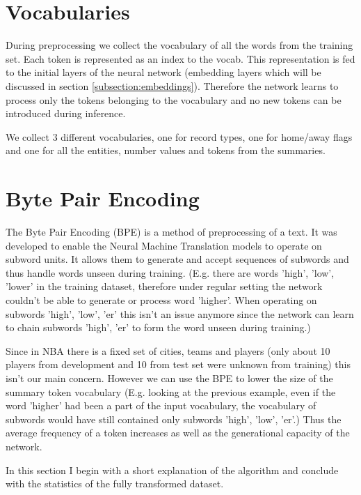 \section{Vocabularies}

During preprocessing we collect the vocabulary of all the words from the training set. Each token is represented as an index to the vocab. This representation is fed to the initial layers of the neural network (embedding layers which will be discussed in section \ref{subsection:embeddings}). Therefore the network learns to process only the tokens belonging to the vocabulary and no new tokens can be introduced during inference.

We collect 3 different vocabularies, one for record types, one for home/away flags and one for all the entities, number values and tokens from the summaries.

\section{Byte Pair Encoding} \label{section:byte_pair_encoding}

The Byte Pair Encoding (BPE) \citep{sennrich2016} is a method of preprocessing of a text. It was developed to enable the Neural Machine Translation models to operate on subword units. It allows them to generate and accept sequences of subwords and thus handle words unseen during training. (E.g. there are words 'high', 'low', 'lower' in the training dataset, therefore under regular setting the network couldn't be able to generate or process word 'higher'. When operating on subwords 'high', 'low', 'er' this isn't an issue anymore since the network can learn to chain subwords 'high', 'er' to form the word unseen during training.)

Since in NBA there is a fixed set of cities, teams and players (only about 10 players from development and 10 from test set were unknown from training) this isn't our main concern. However we can use the BPE to lower the size of the summary token vocabulary (E.g. looking at the previous example, even if the word 'higher' had been a part of the input vocabulary, the vocabulary of subwords would have still contained only subwords 'high', 'low', 'er'.) Thus the average frequency of a token increases as well as the generational capacity of the network.

In this section I begin with a short explanation of the algorithm and conclude with the statistics of the fully transformed dataset.

